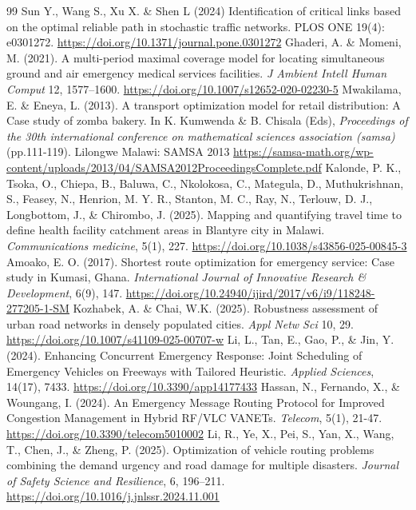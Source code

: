 \documentclass[paper=A4, 12pt, mathscr]{report}
\begin{document}
\begin{thebibliography}{99}
		 Sun Y., Wang S., Xu X. \& Shen L (2024) Identification of critical links based on the optimal reliable path in stochastic traffic networks. PLOS ONE 19(4): e0301272. \url{https://doi.org/10.1371/journal.pone.0301272}
		 Ghaderi, A. \& Momeni, M. (2021). A multi-period maximal coverage model for locating simultaneous ground and air emergency medical services facilities. \textit{J Ambient Intell Human Comput} 12, 1577–1600. \url{https://doi.org/10.1007/s12652-020-02230-5}
		 Mwakilama, E. \& Eneya, L. (2013). A transport optimization model for retail distribution: A Case study of zomba bakery. In K. Kumwenda \& B. Chisala (Eds), \textit{Proceedings of the 30th international conference on mathematical sciences association (samsa)} (pp.111-119). Lilongwe Malawi: SAMSA 2013 \url{https://samsa-math.org/wp-content/uploads/2013/04/SAMSA2012ProceedingsComplete.pdf}
		 Kalonde, P. K., Tsoka, O., Chiepa, B., Baluwa, C., Nkolokosa, C., Mategula, D., Muthukrishnan, S., Feasey, N., Henrion, M. Y. R., Stanton, M. C., Ray, N., Terlouw, D. J., Longbottom, J., \& Chirombo, J. (2025). Mapping and quantifying travel time to define health facility catchment areas in Blantyre city in Malawi. \textit{Communications medicine}, 5(1), 227. \url{https://doi.org/10.1038/s43856-025-00845-3} 
		 Amoako, E. O. (2017). Shortest route optimization for emergency service: Case study in Kumasi, Ghana. \textit{International Journal of Innovative Research \& Development}, 6(9), 147. \url{https://doi.org/10.24940/ijird/2017/v6/i9/118248-277205-1-SM}
		 Kozhabek, A. \& Chai, W.K. (2025). Robustness assessment of urban road networks in densely populated cities. \textit{Appl Netw Sci} 10, 29. \url{https://doi.org/10.1007/s41109-025-00707-w}
		 Li, L., Tan, E., Gao, P., \& Jin, Y. (2024). Enhancing Concurrent Emergency Response: Joint Scheduling of Emergency Vehicles on Freeways with Tailored Heuristic. \textit{Applied Sciences}, 14(17), 7433. \url{https://doi.org/10.3390/app14177433}
		 Hassan, N., Fernando, X., \& Woungang, I. (2024). An Emergency Message Routing Protocol for Improved Congestion Management in Hybrid RF/VLC VANETs. \textit{Telecom}, 5(1), 21-47. \url{https://doi.org/10.3390/telecom5010002}
		 Li, R., Ye, X., Pei, S., Yan, X., Wang, T., Chen, J., \& Zheng, P. (2025). Optimization of vehicle routing problems combining the demand urgency and road damage for multiple disasters. \textit{Journal of Safety Science and Resilience}, 6, 196–211. \url{https://doi.org/10.1016/j.jnlssr.2024.11.001}

\end{thebibliography}
\end{document}
